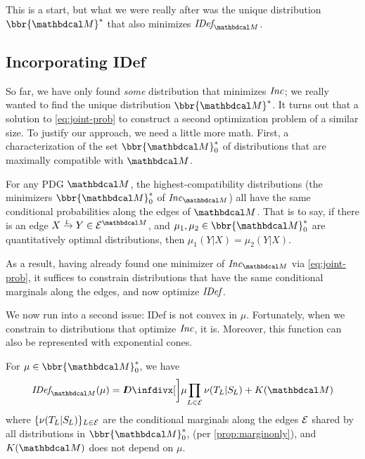 \documentclass[twoside]{article}
\begin{document}
This is a start, but what we were really after was the unique distribution
$\bbr{\dg M}^*$ that also minimizes $\IDef{\dg M}$.

\subsection{Incorporating IDef}


So far, we have only found \emph{some} distribution that minimizes $\mathit{Inc}$; 
we really wanted to find the unique distribution $\bbr{\dg M}^*$.
It turns out that a solution to \eqref{eq:joint-prob}  to construct a second optimization problem of a similar size.
To justify our approach, we need a little more math. 
First, a characterization of the set $\bbr{\dg M}^*_0$ of distributions that are maximally compatible with $\dg M$. 

\begin{prop}\label{prop:marginonly}
	For any PDG $\dg M$, 
	the highest-compatibility distributions (the minimizers $\bbr{\dg M}_0^*$ of $\Inc_{\dg M}$) all have the same conditional probabilities along the edges of $\dg M$.   
	That is to say, if there is an edge $\ed LXY \in \Ed^{\dg M}$, and $\mu_1, \mu_2 \in \bbr{\dg M}_0^*$ are quantitatively optimal distributions, then $\mu_1(Y|X) = \mu_2(Y|X)$.  
\end{prop}

As a result, having already found one minimizer of $\Inc_{\dg M}$ via \eqref{eq:joint-prob}, it suffices to constrain distributions that have the same conditional marginals along the edges, and now optimize $\mathit{IDef}_{\!}$. 

We now run into a second issue: IDef is not convex in $\mu$. 
Fortunately, when we constrain to distributions that optimize $\mathit{Inc}$, 
it is.
Moreover, this function can also be represented with exponential cones.

\begin{prop}
For $\mu \in \bbr{\dg M}_0^*$, 
we have
\[
    \IDef{\dg M}(\mu) = \kldiv[\bigg]{\mu}{ \prod_{L \in \Ed} \nu(\Tgt L | \Src L) }
        + K(\dg M)
\]
where $\{ \nu(\Tgt L | \Src L ) \}_{L \in \Ed}$ are the
conditional marginals along the edges $\mathcal E$ 
shared by all distributions in $\bbr{\dg M}^*_0$,
(per \cref{prop:marginonly}),
and $K(\dg M)$ does not depend on $\mu$. 
\end{prop}
\end{document}
